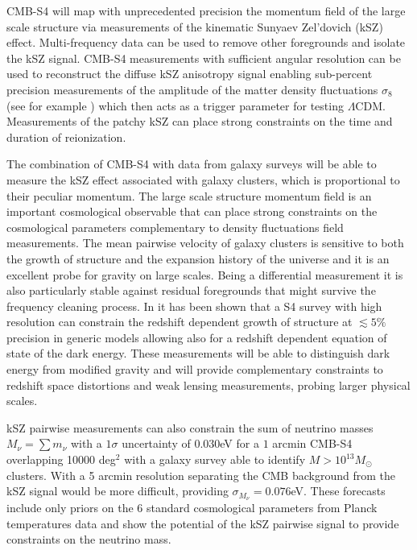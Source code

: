 CMB-S4 will map with unprecedented precision the momentum field of the large scale structure via measurements of the kinematic Sunyaev Zel'dovich (kSZ) effect. Multi-frequency data can be used to remove other foregrounds and isolate the kSZ signal. CMB-S4 measurements with sufficient angular resolution can be used to reconstruct the diffuse kSZ anisotropy signal enabling sub-percent precision measurements of the amplitude of the matter density fluctuations $\sigma_8$ (see for example \cite{Calabrese:2014gwa}) which then acts as a trigger
parameter for testing $\Lambda$CDM. 
Measurements of the patchy kSZ can place strong constraints on the time and duration of reionization.

The combination of CMB-S4 with data from galaxy surveys will be able to measure the kSZ effect associated with galaxy clusters, which is proportional to their peculiar momentum. The large scale structure momentum field is an important cosmological observable that can place strong constraints on the cosmological parameters \cite{Bhattacharya:2007sk,Kosowsky:2009nc,Mueller:2014nsa,Mueller:2014dba} complementary to density fluctuations field measurements. The mean pairwise velocity of galaxy clusters is sensitive to both the growth of structure and the expansion history of the universe and it is an excellent probe for gravity on large scales. Being a differential measurement it is also particularly stable against residual foregrounds that might survive the frequency cleaning process. In \cite{Mueller:2014nsa,Mueller:2014dba} it has been shown that a S4 survey with high resolution can constrain the redshift dependent growth of structure at $\lesssim 5\%$ precision in generic models allowing also for a redshift dependent equation of state of the dark energy. These measurements will be able to distinguish dark energy from modified gravity and will provide complementary constraints to redshift space distortions and weak lensing measurements, probing larger physical scales.

kSZ pairwise measurements can also constrain the sum of neutrino masses $M_{\nu}= \sum m_{\nu}$ with a $1\sigma$ uncertainty of $0.030$eV for a $1$ arcmin CMB-S4 overlapping 10000 deg$^2$ with a galaxy survey able to identify $M>10^{13}M_{\odot}$ clusters. With a 5 arcmin resolution separating the CMB background from the kSZ signal would be more difficult, providing  $\sigma_{M_{\nu}} = 0.076$eV. These forecasts include only priors on the 6 standard cosmological parameters from Planck temperatures data and show the potential of the kSZ pairwise signal to provide constraints on the neutrino mass. 

